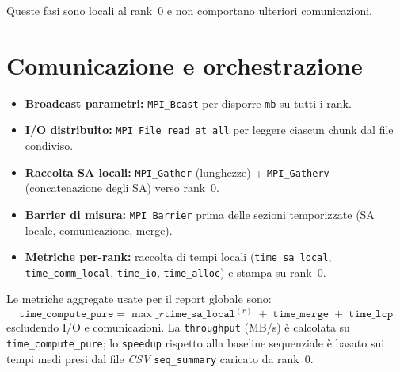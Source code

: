 		Queste fasi sono locali al rank~0 e non comportano ulteriori comunicazioni.
	
	\section{Comunicazione e orchestrazione}
		\begin{itemize}
			\item \textbf{Broadcast parametri:} \texttt{MPI\_Bcast} per disporre \texttt{mb} su tutti i rank.
			\item \textbf{I/O distribuito:} \texttt{MPI\_File\_read\_at\_all} per leggere ciascun chunk dal file condiviso.
			\item \textbf{Raccolta SA locali:} \texttt{MPI\_Gather} (lunghezze) + \texttt{MPI\_Gatherv} (concatenazione degli SA) verso rank~0.
			\item \textbf{Barrier di misura:} \texttt{MPI\_Barrier} prima delle sezioni temporizzate (SA locale, comunicazione, merge).
			\item \textbf{Metriche per-rank:} raccolta di tempi locali (\texttt{time\_sa\_local}, \texttt{time\_comm\_local}, \texttt{time\_io}, \texttt{time\_alloc}) e stampa su rank~0.
		\end{itemize}
		
		Le metriche aggregate usate per il report globale sono:
		$$
		\texttt{time\_compute\_pure} = \max\_r \texttt{time\_sa\_local}^{(r)} \;+\; \texttt{time\_merge} \;+\; \texttt{time\_lcp}
		$$
		escludendo I/O e comunicazioni.
		La \texttt{throughput} (MB/s) è calcolata su \texttt{time\_compute\_pure}; lo \texttt{speedup} rispetto alla baseline sequenziale è basato sui tempi medi presi dal file \textit{CSV} \texttt{seq\_summary} caricato da rank~0.
	
